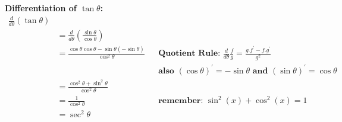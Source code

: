 \documentclass{article}
\begin{document}
{    \textbf{Differentiation of $\tan{\theta}$:}\\
    $
    \boxed{
        \begin{aligned}
            \frac{d}{d\theta}(\tan{\theta})\\
            & = \frac{d}{d\theta}(\frac{\sin{\theta}}{\cos{\theta}})\\
            & =\frac{\cos{\theta}\cos{\theta} - \sin{\theta}(-\sin{\theta})}{\cos^2{\theta}}
                && \textbf{Quotient Rule: $\frac{d}{d\theta}\frac{f}{g} = \frac{g.f^\prime - f.g^\prime}{g^2}$}\\
                &   && \textbf{also $(\cos{\theta})^\prime = -\sin{\theta}$ and $(\sin{\theta})^\prime = \cos{\theta}$}\\
                & =\frac{\cos^2{\theta} + \sin^2{\theta}}{\cos^2{\theta}}\\
            & =\frac{1}{\cos^2{\theta}}
                && \textbf{remember: $\sin^2(x) + \cos^2(x) = 1$}\\
            & =\sec^2{\theta}
        \end{aligned}
        }
    $\\
    
}
\end{document}
